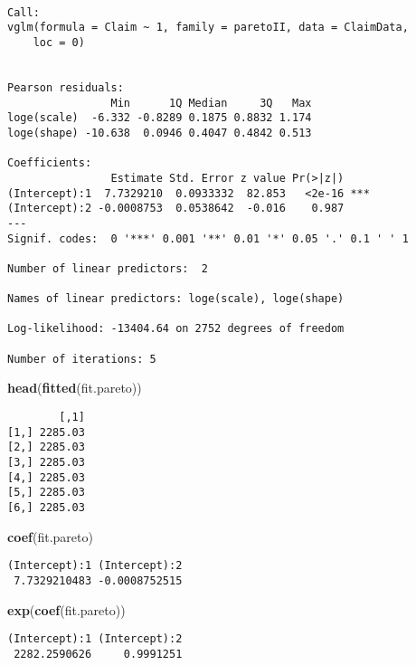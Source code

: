 \documentclass[]{book}
\newenvironment{Shaded}{\begin{snugshade}}{\end{snugshade}}
\newcommand{\KeywordTok}[1]{\textcolor[rgb]{0.13,0.29,0.53}{\textbf{#1}}}
\newcommand{\NormalTok}[1]{#1}
\theoremstyle{definition}
\theoremstyle{definition}
\theoremstyle{definition}
\theoremstyle{remark}
\begin{document}
\begin{verbatim}

Call:
vglm(formula = Claim ~ 1, family = paretoII, data = ClaimData, 
    loc = 0)


Pearson residuals:
                Min      1Q Median     3Q   Max
loge(scale)  -6.332 -0.8289 0.1875 0.8832 1.174
loge(shape) -10.638  0.0946 0.4047 0.4842 0.513

Coefficients: 
                Estimate Std. Error z value Pr(>|z|)    
(Intercept):1  7.7329210  0.0933332  82.853   <2e-16 ***
(Intercept):2 -0.0008753  0.0538642  -0.016    0.987    
---
Signif. codes:  0 '***' 0.001 '**' 0.01 '*' 0.05 '.' 0.1 ' ' 1

Number of linear predictors:  2 

Names of linear predictors: loge(scale), loge(shape)

Log-likelihood: -13404.64 on 2752 degrees of freedom

Number of iterations: 5 
\end{verbatim}

\begin{Shaded}
\begin{Highlighting}[]
\KeywordTok{head}\NormalTok{(}\KeywordTok{fitted}\NormalTok{(fit.pareto))}
\end{Highlighting}
\end{Shaded}

\begin{verbatim}
        [,1]
[1,] 2285.03
[2,] 2285.03
[3,] 2285.03
[4,] 2285.03
[5,] 2285.03
[6,] 2285.03
\end{verbatim}

\begin{Shaded}
\begin{Highlighting}[]
\KeywordTok{coef}\NormalTok{(fit.pareto)}
\end{Highlighting}
\end{Shaded}

\begin{verbatim}
(Intercept):1 (Intercept):2 
 7.7329210483 -0.0008752515 
\end{verbatim}

\begin{Shaded}
\begin{Highlighting}[]
\KeywordTok{exp}\NormalTok{(}\KeywordTok{coef}\NormalTok{(fit.pareto))}
\end{Highlighting}
\end{Shaded}

\begin{verbatim}
(Intercept):1 (Intercept):2 
 2282.2590626     0.9991251 
\end{verbatim}
\end{document}
